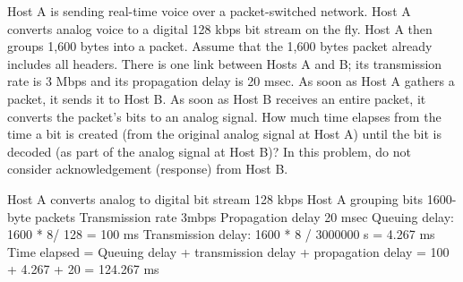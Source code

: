 \documentclass{report}
\begin{document}
\begin{problem}
Host A is sending real-time voice over a packet-switched network. Host A converts analog voice to a digital 128 kbps bit stream on the fly. Host A then groups 1,600 bytes into a packet. Assume that the 1,600 bytes packet already includes all headers. There is one link between Hosts A and B; its transmission rate is 3 Mbps and its propagation delay is 20 msec. As soon as Host A gathers a packet, it sends it to Host B. As soon as Host B receives an entire packet, it converts the packet’s bits to an analog signal. How much time elapses from the time a bit is created (from the original analog signal at Host A) until the bit is decoded (as part of the analog signal at Host B)? In this problem, do not consider acknowledgement (response) from Host B.

    \begin{answer}{30em}
    Host A converts analog to digital bit stream 128 kbps \newline
    Host A grouping bits 1600-byte packets \newline
    Transmission rate 3mbps \newline
    Propagation delay 20 msec \newline
    Queuing delay: 1600 * 8/ 128 = 100 ms \newline
    Transmission delay: 1600 * 8 / 3000000 s = 4.267 ms \newline
    Time elapsed = Queuing delay + transmission delay + propagation delay = 100 + 4.267 + 20 = 124.267 ms
    
    \end{answer}

\end{problem}

\newpage
\end{document}
